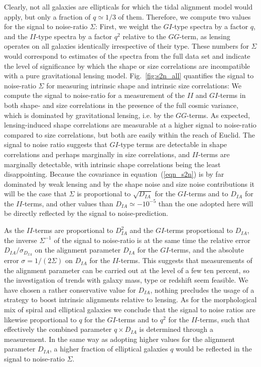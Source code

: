 \documentclass[a4paper,fleqn,usenatbib]{mnras}
\begin{document}
Clearly, not all galaxies are ellipticals for which the tidal alignment model would apply, but only a fraction of $q\simeq 1/3$ of them. Therefore, we compute two values for the signal to noise-ratio $\Sigma$: First, we weight the $GI$-type spectra by a factor $q$, and the $II$-type spectra by a factor $q^2$ relative to the $GG$-term, as lensing operates on all galaxies identically irrespective of their type. These numbers for $\Sigma$ would correspond to estimates of the spectra from the full data set and indicate the level of significance by which the shape or size correlations are incompatible with a pure gravitational lensing model. Fig.~\ref{fig:s2n_all} quantifies the signal to noise-ratio $\Sigma$ for measuring intrinsic shape and intrinsic size correlations: We compute the signal to noise-ratio for a measurement of the $II$ and $GI$-terms in both shape- and size correlations in the presence of the full cosmic variance, which is dominated by gravitational lensing, i.e. by the $GG$-terms. As expected, lensing-induced shape correlations are measurable at a higher signal to noise-ratio compared to size correlations, but both are easily within the reach of Euclid. The signal to noise ratio suggests that $GI$-type terms are detectable in shape correlations and perhaps marginally in size correlations, and $II$-terms are marginally detectable, with intrinsic shape correlations being the least disappointing. Because the covariance in equation~(\ref{eqn_s2n}) is by far dominated by weak lensing and by the shape noise and size noise contributions it will be the case that $\Sigma$ is proportional to $\sqrt{D_{IA}}$ for the $GI$-terms and to $D_{IA}$ for the $II$-terms, and other values than $D_{IA}\simeq -10^{-5}$ than the one adopted here will be directly reflected by the signal to noise-prediction. 

As the $II$-terms are proportional to $D_{IA}^2$ and the $GI$-terms proportional to $D_{IA}$, the inverse $\Sigma^{-1}$ of the signal to noise-ratio is at the same time the relative error $D_{IA}/\sigma_{D_{IA}}$ on the alignment parameter $D_{IA}$ for the $GI$-terms, and the absolute error $\sigma = 1/(2\Sigma)$ on $D_{IA}$ for the $II$-terms. This suggests that measurements of the alignment parameter can be carried out at the level of a few ten percent, so the investigation of trends with galaxy mass, type or redshift seem feasible. We have chosen a rather conservative value for $D_{IA}$, nothing precludes the usage of a strategy to boost intrinsic alignments relative to lensing. As for the morphological mix of spiral and elliptical galaxies we conclude that the signal to noise ratios are likewise proportional to $q$ for the $GI$-terms and to $q^2$ for the $II$-terms, such that effectively the combined parameter $q\times D_{IA}$ is determined through a measurement. In the same way as adopting higher values for the alignment parameter $D_{IA}$, a higher fraction of elliptical galaxies $q$ would be reflected in the signal to noise-ratio $\Sigma$.
\end{document}
